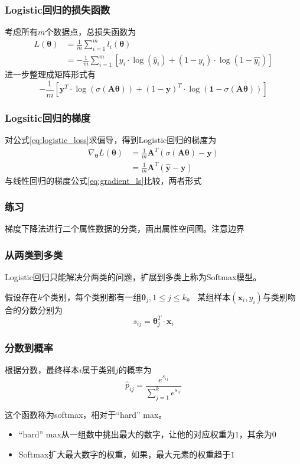 \documentclass[14pt]{beamer}
\newcommand{\mat}[1]{\bm{#1}}
\renewcommand{\vec}[1]{\bm{#1}}
\newcommand{\MA}{\mat{A}}
\newcommand{\Vy}{\vec{y}}
\newcommand{\Vx}{\vec{x}}
\newcommand{\Vt}{\vec{\theta}}
\let\emph\relax %
\begin{document}
\begin{frame}
  \frametitle{Logistic回归的损失函数}
  考虑所有$m$个数据点，总损失函数为
  \begin{equation*}
    \begin{split}
    L(\Vt)&=\frac{1}{m}\sum_{i=1}^m l_i(\Vt)\\
    &=-\frac{1}{m}\sum_{i=1}^m[y_i\cdot\log(\hat{y}_i)+(1-y_i)\cdot\log(1-\hat{y_i})]
    \end{split}
  \end{equation*}
  进一步整理成矩阵形式有
  \begin{equation}\label{eq:logistic_loss}
    \boxed{-\frac{1}{m}[\Vy^T\cdot\log(\sigma(\MA\Vt))+(1-\Vy)^T\cdot\log(\vec{1}-\sigma(\MA\Vt))]}
  \end{equation}
\end{frame}

\begin{frame}
  \frametitle{Logsitic回归的梯度}
  对公式\ref{eq:logistic_loss}求偏导，得到Logistic回归的梯度为
  \begin{equation}
    \begin{split}
    \nabla_{\Vt}L(\Vt)&=\frac{1}{m}\MA^T(\sigma(\MA\Vt)-\Vy)\\
    &=\frac{1}{m}\MA^T(\hat{\Vy}-\Vy)
    \end{split}
  \end{equation}
  与线性回归的梯度公式\ref{eq:gradient_ls}比较，两者形式\emph{高度相似}

\end{frame}

\begin{frame}
  \frametitle{练习}
  梯度下降法进行二个属性数据的分类，画出属性空间图。注意边界
  
\end{frame}

\begin{frame}
  \frametitle{从两类到多类}
  Logistic回归只能解决分两类的问题，扩展到多类上称为Softmax模型。

  假设存在$k$个类别，每个类别都有一组\emph{打分系数}$\Vt_j,1\leq j\leq k$。
  某组样本$(\Vx_i, y_i)$与类别吻合的分数分别为
  \begin{equation}
    s_{ij}=\Vt_j^T\cdot\Vx_i
  \end{equation}
\end{frame}

\begin{frame}
  \frametitle{分数到概率}
  根据分数，最终样本$i$属于类别$j$的概率为
  \begin{equation}
    \hat{p}_{ij}=\frac{e^{s_{ij}}}{\sum_{j=1}^k e^{s_{ij}}}
  \end{equation}

  这个函数称为softmax，相对于“hard” max。
  \begin{itemize}
    \item “hard” max从一组数中挑出最大的数字，让他的对应权重为$1$，其余为$0$
    \item Softmax扩大最大数字的权重，如果\emph{反复应用}，最大元素的权重趋于$1$
  \end{itemize}
\end{frame}
\end{document}
